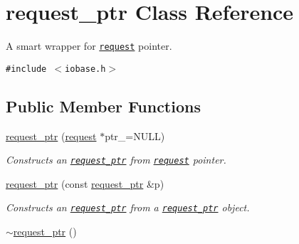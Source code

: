 \hypertarget{classrequest__ptr}{
\section{request\_\-ptr Class Reference}
\label{classrequest__ptr}
}
A smart wrapper for {\tt \hyperlink{classrequest}{request}} pointer.  


{\tt \#include $<$iobase.h$>$}

\subsection*{Public Member Functions}
\begin{CompactItemize}
\item 
\hypertarget{group__iolayer_ge78ff55c792061dae60eebda7b08615a}{
\hyperlink{group__iolayer_ge78ff55c792061dae60eebda7b08615a}{request\_\-ptr} (\hyperlink{classrequest}{request} $\ast$ptr\_\-=NULL)}
\label{group__iolayer_ge78ff55c792061dae60eebda7b08615a}

\begin{CompactList}\small\item\em Constructs an {\tt \hyperlink{classrequest__ptr}{request\_\-ptr}} from {\tt \hyperlink{classrequest}{request}} pointer. \item\end{CompactList}\item 
\hypertarget{group__iolayer_gfbd62f3bb0fe9378ffe9defd6be764dc}{
\hyperlink{group__iolayer_gfbd62f3bb0fe9378ffe9defd6be764dc}{request\_\-ptr} (const \hyperlink{classrequest__ptr}{request\_\-ptr} \&p)}
\label{group__iolayer_gfbd62f3bb0fe9378ffe9defd6be764dc}

\begin{CompactList}\small\item\em Constructs an {\tt \hyperlink{classrequest__ptr}{request\_\-ptr}} from a {\tt \hyperlink{classrequest__ptr}{request\_\-ptr}} object. \item\end{CompactList}\item 
\hypertarget{group__iolayer_g3dd322205e1e61403b2d14874a543ab4}{
\hyperlink{group__iolayer_g3dd322205e1e61403b2d14874a543ab4}{$\sim$request\_\-ptr} ()}
\label{group__iolayer_g3dd322205e1e61403b2d14874a543ab4}


\end{CompactItemize}
